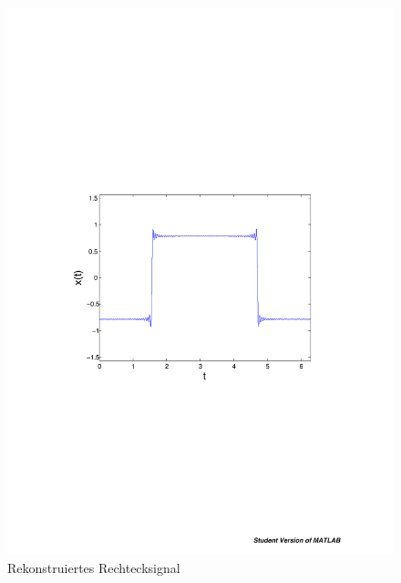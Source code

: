 \begin{refsection}
\begin{figure}
\begin{minipage}[hbt]{0.5\textwidth}
\includegraphics[width=1\textwidth]{kugel/Gibbs/Gibbs.pdf}
\caption{Rekonstruiertes Rechtecksignal}
\label{skript:Gibbsre}
\end{minipage}
\end{figure}


\end{refsection}
